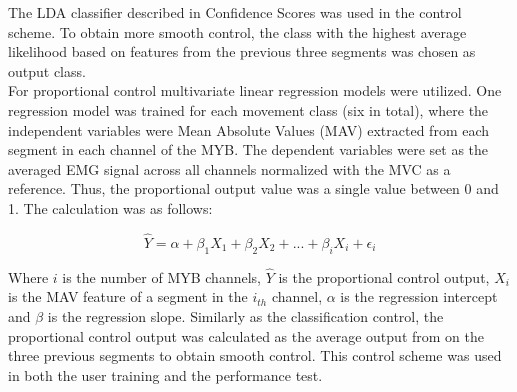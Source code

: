 The LDA classifier described in Confidence Scores was used in the control scheme. To obtain more smooth control, the class with the highest average likelihood based on features from the previous three segments was chosen as output class. \\
For proportional control multivariate linear regression models were utilized. One regression model was trained for each movement class (six in total), where the independent variables were Mean Absolute Values (MAV) extracted from each segment in each channel of the MYB. The dependent variables were set as the averaged EMG signal across all channels normalized with the MVC as a reference. Thus, the proportional output value was a single value between 0 and 1. The calculation was as follows: 

\begin{equation} \label{eq:P:multiLinearRegression}
\hat{Y} = \alpha + \beta_1 X_{1} + \beta_2 X_{2} + ... + \beta_i X_{i} + \epsilon_i
\end{equation} 

Where $i$ is the number of MYB channels, $\hat{Y}$ is the proportional control output, $X_{i}$ is the MAV feature of a segment in the $i_{th}$ channel, $\alpha$ is the regression intercept and $\beta$ is the regression slope. Similarly as the classification control, the proportional control output was calculated as the average output from on the three previous segments to obtain smooth control. This control scheme was used in both the user training and the performance test.